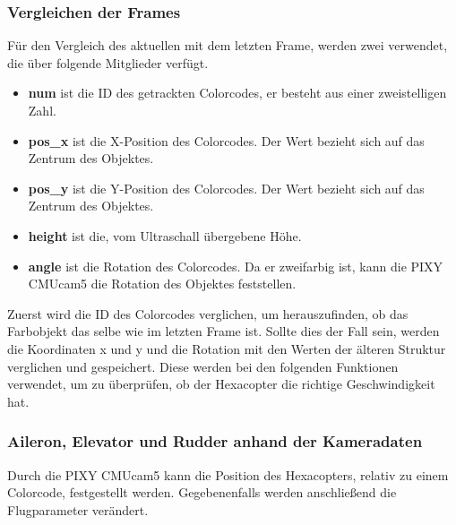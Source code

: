     \subsubsection{Vergleichen der Frames}
    Für den Vergleich des aktuellen mit dem letzten Frame, werden zwei  verwendet, die über folgende Mitglieder verfügt. \cite{Structs}
    \begin{itemize}
      \item \textbf{num} ist die ID des getrackten Colorcodes, er besteht aus einer zweistelligen Zahl.
      \item \textbf{pos\_x} ist die X-Position des Colorcodes. Der Wert bezieht sich auf das Zentrum des Objektes.
      \item \textbf{pos\_y} ist die Y-Position des Colorcodes. Der Wert bezieht sich auf das Zentrum des Objektes.
      \item \textbf{height} ist die, vom Ultraschall übergebene Höhe.
      \item \textbf{angle} ist die Rotation des Colorcodes. Da er zweifarbig ist, kann die PIXY CMUcam5 die Rotation des Objektes feststellen.
    \end{itemize}

    Zuerst wird die ID des Colorcodes verglichen, um herauszufinden, ob das Farbobjekt das selbe wie im letzten Frame ist.
    Sollte dies der Fall sein, werden die Koordinaten x und y und die Rotation mit den Werten der älteren Struktur verglichen und gespeichert.
    Diese werden bei den folgenden Funktionen verwendet, um zu überprüfen, ob der Hexacopter die richtige Geschwindigkeit hat.

    \subsubsection{Aileron, Elevator und Rudder anhand der Kameradaten}
    Durch die PIXY CMUcam5 kann die Position des Hexacopters, relativ zu einem Colorcode, festgestellt werden. Gegebenenfalls werden anschließend die Flugparameter verändert.

